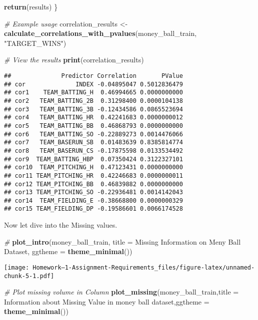 \documentclass[
]{article}
\newenvironment{Shaded}{\begin{snugshade}}{\end{snugshade}}
\newcommand{\AttributeTok}[1]{\textcolor[rgb]{0.13,0.29,0.53}{#1}}
\newcommand{\CommentTok}[1]{\textcolor[rgb]{0.56,0.35,0.01}{\textit{#1}}}
\newcommand{\FunctionTok}[1]{\textcolor[rgb]{0.13,0.29,0.53}{\textbf{#1}}}
\newcommand{\NormalTok}[1]{#1}
\newcommand{\OtherTok}[1]{\textcolor[rgb]{0.56,0.35,0.01}{#1}}
\newcommand{\StringTok}[1]{\textcolor[rgb]{0.31,0.60,0.02}{#1}}
\begin{document}
\begin{Shaded}
\begin{Highlighting}[]
  \FunctionTok{return}\NormalTok{(results)}
\NormalTok{\}}


\CommentTok{\# Example usage}
\NormalTok{correlation\_results }\OtherTok{\textless{}{-}} \FunctionTok{calculate\_correlations\_with\_pvalues}\NormalTok{(money\_ball\_train, }\StringTok{"TARGET\_WINS"}\NormalTok{)}

\CommentTok{\# View the results}
\FunctionTok{print}\NormalTok{(correlation\_results)}
\end{Highlighting}
\end{Shaded}

\begin{verbatim}
##              Predictor Correlation       PValue
## cor              INDEX -0.04895047 0.5012836479
## cor1    TEAM_BATTING_H  0.46994665 0.0000000000
## cor2   TEAM_BATTING_2B  0.31298400 0.0000104138
## cor3   TEAM_BATTING_3B -0.12434586 0.0865523694
## cor4   TEAM_BATTING_HR  0.42241683 0.0000000012
## cor5   TEAM_BATTING_BB  0.46868793 0.0000000000
## cor6   TEAM_BATTING_SO -0.22889273 0.0014476066
## cor7   TEAM_BASERUN_SB  0.01483639 0.8385814774
## cor8   TEAM_BASERUN_CS -0.17875598 0.0133534492
## cor9  TEAM_BATTING_HBP  0.07350424 0.3122327101
## cor10  TEAM_PITCHING_H  0.47123431 0.0000000000
## cor11 TEAM_PITCHING_HR  0.42246683 0.0000000011
## cor12 TEAM_PITCHING_BB  0.46839882 0.0000000000
## cor13 TEAM_PITCHING_SO -0.22936481 0.0014142043
## cor14  TEAM_FIELDING_E -0.38668800 0.0000000329
## cor15 TEAM_FIELDING_DP -0.19586601 0.0066174528
\end{verbatim}

Now let dive into the Missing values.

\begin{Shaded}
\begin{Highlighting}[]
\CommentTok{\# }
\FunctionTok{plot\_intro}\NormalTok{(money\_ball\_train, }\AttributeTok{title =} \StringTok{\textquotesingle{}Missing Information on Meny Ball Dataset\textquotesingle{}}\NormalTok{,}
           \AttributeTok{ggtheme =} \FunctionTok{theme\_minimal}\NormalTok{())}
\end{Highlighting}
\end{Shaded}

\texttt{[image: Homework--1-Assignment-Requirements\_files/figure-latex/unnamed-chunk-5-1.pdf]}

\begin{Shaded}
\begin{Highlighting}[]
\CommentTok{\# Plot missing volume in Column }
\FunctionTok{plot\_missing}\NormalTok{(money\_ball\_train,}\AttributeTok{title =} \StringTok{\textquotesingle{}Information about Missing Value in money ball dataset\textquotesingle{}}\NormalTok{,}\AttributeTok{ggtheme =} \FunctionTok{theme\_minimal}\NormalTok{())}
\end{Highlighting}
\end{Shaded}
\end{document}
